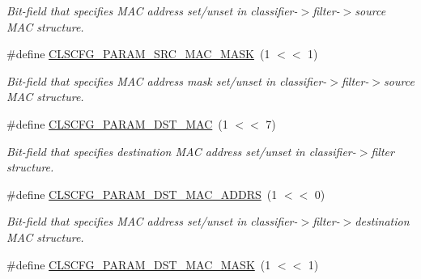 \begin{DoxyCompactItemize}
\begin{DoxyCompactList}\small\item\em Bit-\/field that specifies M\-A\-C address set/unset in classifier-\/$>$filter-\/$>$source M\-A\-C structure. \end{DoxyCompactList}\item 
\hypertarget{group__FAPI__QOS__CLASS_gaee00e97e2fcfdeb266ecb698829d665d}{\#define \hyperlink{group__FAPI__QOS__CLASS_gaee00e97e2fcfdeb266ecb698829d665d}{C\-L\-S\-C\-F\-G\-\_\-\-P\-A\-R\-A\-M\-\_\-\-S\-R\-C\-\_\-\-M\-A\-C\-\_\-\-M\-A\-S\-K}~(1 $<$$<$ 1)}\label{group__FAPI__QOS__CLASS_gaee00e97e2fcfdeb266ecb698829d665d}

\begin{DoxyCompactList}\small\item\em Bit-\/field that specifies M\-A\-C address mask set/unset in classifier-\/$>$filter-\/$>$source M\-A\-C structure. \end{DoxyCompactList}\item 
\hypertarget{group__FAPI__QOS__CLASS_gadeac463ec45444644c63a7e5ce11157b}{\#define \hyperlink{group__FAPI__QOS__CLASS_gadeac463ec45444644c63a7e5ce11157b}{C\-L\-S\-C\-F\-G\-\_\-\-P\-A\-R\-A\-M\-\_\-\-D\-S\-T\-\_\-\-M\-A\-C}~(1 $<$$<$ 7)}\label{group__FAPI__QOS__CLASS_gadeac463ec45444644c63a7e5ce11157b}

\begin{DoxyCompactList}\small\item\em Bit-\/field that specifies destination M\-A\-C address set/unset in classifier-\/$>$filter structure. \end{DoxyCompactList}\item 
\hypertarget{group__FAPI__QOS__CLASS_ga1bc9053d7aedef717825617895133a45}{\#define \hyperlink{group__FAPI__QOS__CLASS_ga1bc9053d7aedef717825617895133a45}{C\-L\-S\-C\-F\-G\-\_\-\-P\-A\-R\-A\-M\-\_\-\-D\-S\-T\-\_\-\-M\-A\-C\-\_\-\-A\-D\-D\-R\-S}~(1 $<$$<$ 0)}\label{group__FAPI__QOS__CLASS_ga1bc9053d7aedef717825617895133a45}

\begin{DoxyCompactList}\small\item\em Bit-\/field that specifies M\-A\-C address set/unset in classifier-\/$>$filter-\/$>$destination M\-A\-C structure. \end{DoxyCompactList}\item 
\hypertarget{group__FAPI__QOS__CLASS_ga62bbf91589988695683d25cbfcd76308}{\#define \hyperlink{group__FAPI__QOS__CLASS_ga62bbf91589988695683d25cbfcd76308}{C\-L\-S\-C\-F\-G\-\_\-\-P\-A\-R\-A\-M\-\_\-\-D\-S\-T\-\_\-\-M\-A\-C\-\_\-\-M\-A\-S\-K}~(1 $<$$<$ 1)}\label{group__FAPI__QOS__CLASS_ga62bbf91589988695683d25cbfcd76308}


\end{DoxyCompactItemize}
